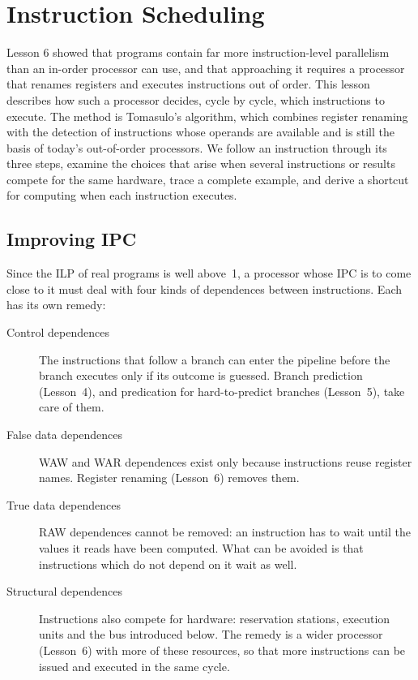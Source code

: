 \documentclass[../main.tex]{subfiles}
\begin{document}
\chapter{Instruction Scheduling}

Lesson 6 showed that programs contain far more instruction-level parallelism
than an in-order processor can use, and that approaching it requires a
processor that renames registers and executes instructions out of order.
This lesson describes how such a processor decides, cycle by cycle, which
instructions to execute.  The method is Tomasulo's algorithm, which combines
register renaming with the detection of instructions whose operands are
available and is still the basis of today's out-of-order processors.  We
follow an instruction through its three steps, examine the choices that arise
when several instructions or results compete for the same hardware, trace a
complete example, and derive a shortcut for computing when each instruction
executes.

\section{Improving IPC}
\label{sec:l07-ipc}

Since the ILP of real programs is well above~1, a processor whose IPC is to
come close to it must deal with four kinds of dependences between
instructions.  Each has its own
remedy:
\begin{description}
  \item[Control dependences] The instructions that follow a branch can enter
    the pipeline before the branch executes only if its outcome is guessed.
    Branch prediction (Lesson~4), and predication for hard-to-predict branches
    (Lesson~5), take care of them.
  \item[False data dependences] WAW and WAR dependences exist only because
    instructions reuse register names.  Register renaming (Lesson~6) removes
    them.
  \item[True data dependences] RAW dependences cannot be removed: an
    instruction has to wait until the values it reads have been
    computed.
    What can be avoided is that instructions which do not depend on it wait as
    well.
  \item[Structural dependences] Instructions also compete for hardware:
    reservation stations, execution units and the bus introduced below.  The
    remedy is a wider processor (Lesson~6) with more of these resources, so
    that more instructions can be issued and executed in the same cycle.
\end{description}
\end{document}

